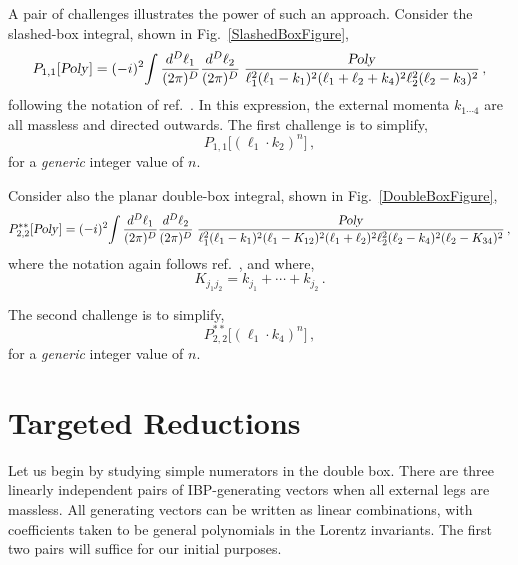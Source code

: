 \documentclass[aps,prd,preprint,groupedaddress,nofootinbib,showpacs,eqsecnum]{revtex4}
\def\fig#1{Fig.~{\ref{#1}}}
\def\eps{\epsilon}
\def\Pn#1#2{P_{#1,#2}}
\def\Pss#1#2{P^{**}_{#1,#2}}
\begin{document}
A pair of challenges illustrates the power of such an approach.  Consider
the slashed-box integral, shown in \fig{SlashedBoxFigure},
\begin{equation}
\Pn11[\Poly] = (-i)^2\!\int 
\frac{d^D\ell_1}{(2\pi)^D} \frac{d^D\ell_2}{(2\pi)^D}
\;\frac{\Poly}{\ell_1^2 (\ell_1-k_1)^2 (\ell_1+\ell_2+k_4)^2
	\ell_2^2 (\ell_2-k_3)^2}\,,
\end{equation}
following the notation of ref.~\cite{IBPGeneratingVectors}.  In this
expression, the external momenta $k_{1\cdots 4}$ are all massless and
directed outwards.
The first challenge is to simplify,
\begin{equation}
\Pn11\bigl[(\ell_1\cdot k_2)^n\bigr]\,,
\label{SlashedBoxChallenge}
\end{equation}
for a \textit{generic\/} integer value of $n$.

Consider also the planar double-box integral,
shown in \fig{DoubleBoxFigure},
\begin{equation}
\Pss22[\Poly] = (-i)^2\!\int 
\frac{d^D\ell_1}{(2\pi)^D} \frac{d^D\ell_2}{(2\pi)^D}
\;\frac{\Poly}{\ell_1^2 (\ell_1-k_1)^2 (\ell_1-K_{12})^2(\ell_1+\ell_2)^2
	\ell_2^2 (\ell_2-k_4)^2 (\ell_2-K_{34})^2}\,,
\end{equation}
where the notation again follows ref.~\cite{IBPGeneratingVectors}, and where,
\begin{equation}
K_{j_1 j_2} = k_{j_1}+\cdots+k_{j_2}\,.
\end{equation}

The second challenge is to simplify,
\begin{equation}
\Pss22\bigl[(\ell_1\cdot k_4)^n\bigr]\,,
\label{DoubleBoxChallenge}
\end{equation}
for a \textit{generic\/} integer value of $n$.


\def\ch{{\hat c}}
\def\e{\eps}
\section{Targeted Reductions}
\label{TargetedReductionsSection}

Let us begin by studying simple numerators in the double box.
There are three linearly independent pairs of IBP-generating vectors
when all external legs are massless.  All generating vectors can
be written as linear combinations, with coefficients
taken to be general polynomials in the Lorentz invariants.
The first two pairs will suffice for our initial purposes.
\end{document}
